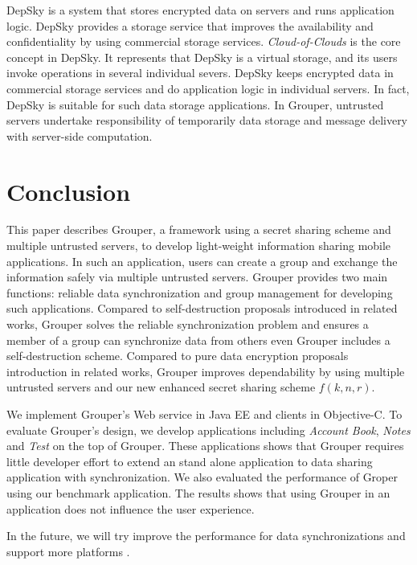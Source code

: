 \documentclass[twocolumn,10pt]{article}
\begin{document}
DepSky\cite{bessani2013depsky} is a system that stores encrypted data on servers and runs application logic. 
DepSky provides a storage service that improves the availability and confidentiality by using commercial storage services. 
\emph{Cloud-of-Clouds} is the core concept in DepSky. 
It represents that DepSky is a virtual storage, and its users invoke operations in several individual severs. 
DepSky keeps encrypted data in commercial storage services and do application logic in individual servers.
In fact, DepSky is suitable for such data storage applications. 
In Grouper, untrusted servers undertake responsibility of temporarily data storage and message delivery with server-side computation.

\section{Conclusion}

This paper describes Grouper, a framework using a secret sharing scheme and multiple untrusted servers, to develop light-weight information sharing mobile applications.
In such an application, users can create a group and exchange the information safely via multiple untrusted servers.
Grouper provides two main functions: reliable data synchronization and group management for developing such applications.
Compared to self-destruction proposals introduced in related works, Grouper solves the reliable synchronization problem and ensures a member of a group can synchronize data from others even Grouper includes a self-destruction scheme.
Compared to pure data encryption proposals introduction in related works, Grouper improves dependability by using multiple untrusted servers and our new enhanced secret sharing scheme $f(k, n, r)$.

We implement Grouper's Web service in Java EE and clients in Objective-C. 
To evaluate Grouper's design, we develop applications including \emph{Account Book}, \emph{Notes} and \emph{Test} on the top of Grouper.
These applications shows that Grouper requires little developer effort to extend an stand alone application to data sharing application with synchronization.
We also evaluated the performance of Groper using our benchmark application.
The results shows that using Grouper in an application does not influence the user experience.

In the future, we will try improve the performance for data synchronizations and support more platforms .


{
	\footnotesize
	
}
\end{document}
